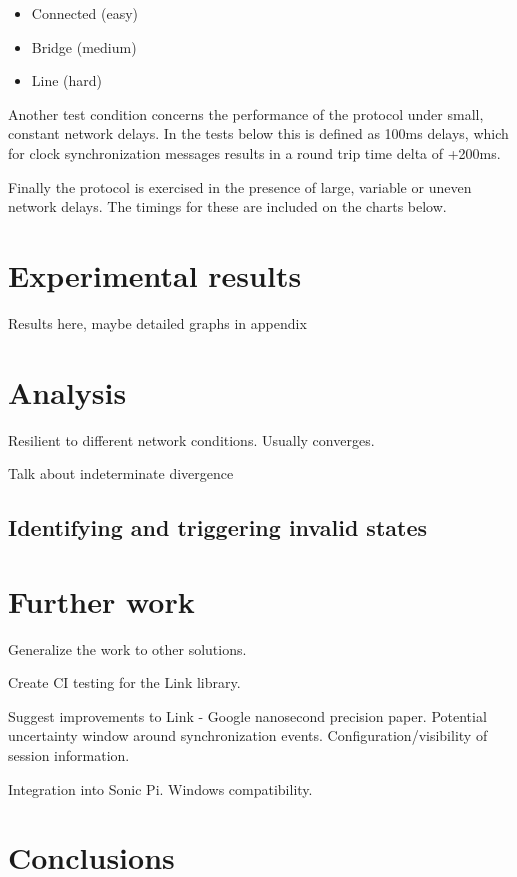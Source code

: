 \documentclass[11pt]{article} %
\theoremstyle{plain}
\theoremstyle{definition}
\begin{document}
\begin{itemize}
  \item Connected (easy)
  \item Bridge (medium)
  \item Line (hard)
\end{itemize}

Another test condition concerns the performance of the protocol under small,
constant network delays. In the tests below this is defined as 100ms delays,
which for clock synchronization messages results in a round trip time delta of
+200ms.

Finally the protocol is exercised in the presence of large, variable or uneven
network delays. The timings for these are included on the charts below.

\section{Experimental results}

Results here, maybe detailed graphs in appendix

\section{Analysis}

Resilient to different network conditions. Usually converges.

Talk about indeterminate divergence

\subsection{Identifying and triggering invalid states}

\section{Further work}

Generalize the work to other solutions.

Create CI testing for the Link library.

Suggest improvements to Link - Google nanosecond precision paper. Potential
uncertainty window around synchronization events. Configuration/visibility of
session information.

Integration into Sonic Pi. Windows compatibility.

\section{Conclusions}
\end{document}
